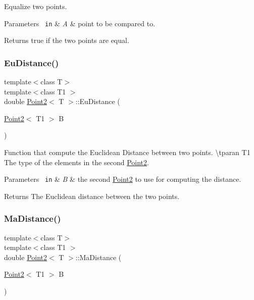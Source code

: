 Equalize two points. 


\begin{DoxyParams}[1]{Parameters}
\mbox{\texttt{ in}}  & {\em A} & point to be compared to. \\
\hline
\end{DoxyParams}
\begin{DoxyReturn}{Returns}
true if the two points are equal. 
\end{DoxyReturn}
\mbox{\label{class_point2_aa930b619ed2efeda96b4210ee3b8cb9c}} 
\subsubsection{\texorpdfstring{EuDistance()}{EuDistance()}}
{\footnotesize\ttfamily template$<$class T$>$ \\
template$<$class T1 $>$ \\
double \mbox{\hyperlink{class_point2}{Point2}}$<$ T $>$\+::Eu\+Distance (\begin{DoxyParamCaption}\item[{\mbox{\hyperlink{class_point2}{Point2}}$<$ T1 $>$}]{B }\end{DoxyParamCaption})\hspace{0.3cm}{\ttfamily [inline]}}



Function that compute the Euclidean Distance between two points. \textbackslash{}tparan T1 The type of the elements in the second {\ttfamily \mbox{\hyperlink{class_point2}{Point2}}}. 


\begin{DoxyParams}[1]{Parameters}
\mbox{\texttt{ in}}  & {\em B} & the second {\ttfamily \mbox{\hyperlink{class_point2}{Point2}}} to use for computing the distance. \\
\hline
\end{DoxyParams}
\begin{DoxyReturn}{Returns}
The Euclidean distance between the two points. 
\end{DoxyReturn}
\mbox{\label{class_point2_a10a4aa3d7939b1675f4bd18b8f9f0ead}} 
\subsubsection{\texorpdfstring{MaDistance()}{MaDistance()}}
{\footnotesize\ttfamily template$<$class T$>$ \\
template$<$class T1 $>$ \\
double \mbox{\hyperlink{class_point2}{Point2}}$<$ T $>$\+::Ma\+Distance (\begin{DoxyParamCaption}\item[{\mbox{\hyperlink{class_point2}{Point2}}$<$ T1 $>$}]{B }\end{DoxyParamCaption})\hspace{0.3cm}{\ttfamily [inline]}}



